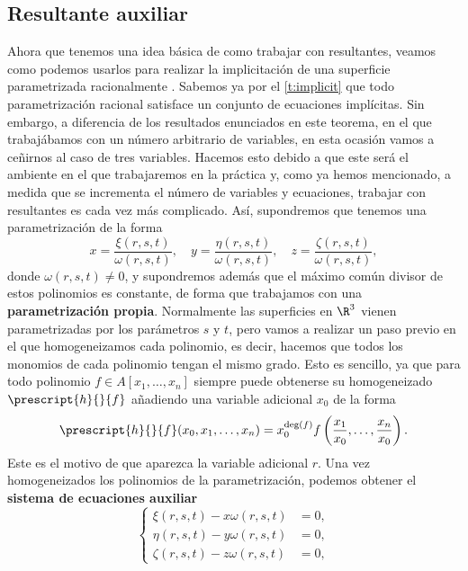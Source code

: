 \subsection{Resultante auxiliar}
Ahora que tenemos una idea básica de como trabajar con resultantes, veamos como podemos usarlos para realizar la implicitación de una superficie parametrizada racionalmente \cite{res1}. Sabemos ya por el \autoref{t:implicit} que todo parametrización racional satisface un conjunto de ecuaciones implícitas. Sin embargo, a diferencia de los resultados enunciados en este teorema, en el que trabajábamos con un número arbitrario de variables, en esta ocasión vamos a ceñirnos al caso de tres variables. Hacemos esto debido a que este será el ambiente en el que trabajaremos en la práctica y, como ya hemos mencionado, a medida que se incrementa el número de variables y ecuaciones, trabajar con resultantes es cada vez más complicado. Así, supondremos que tenemos una parametrización de la forma
\begin{equation}\label{eq:param}
    x = \frac{\xi(r,s,t)}{\omega(r,s,t)},\quad y= \frac{\eta(r,s,t)}{\omega(r,s,t)},\quad  z= \frac{\zeta(r,s,t)}{\omega(r,s,t)},
\end{equation}
donde $\omega(r,s,t)\neq 0$, y supondremos además que el máximo común divisor de estos polinomios es constante, de forma que trabajamos con una \textbf{parametrización propia}. Normalmente las superficies en $\R^3$ vienen parametrizadas por los parámetros $s$ y $t$, pero vamos a realizar un paso previo en el que homogeneizamos cada polinomio, es decir, hacemos que todos los monomios de cada polinomio tengan el mismo grado. Esto es sencillo, ya que para todo polinomio $f\in A[x_1,\dots, x_n]$ siempre puede obtenerse su homogeneizado $\prescript{h}{}{f}$ añadiendo una variable adicional $x_0$ \cite{wiki-homog} de la forma
\begin{equation*}
    \prescript{h}{}{f}(x_0,x_1,\dots, x_n) = x_0^{\deg(f)}f\left(\frac{x_1}{x_0},\dots, \frac{x_n}{x_0}  \right).
\end{equation*}
Este es el motivo de que aparezca la variable adicional $r$. Una vez homogeneizados los polinomios de la parametrización, podemos obtener el \textbf{sistema de ecuaciones auxiliar}
\begin{equation}\label{eq:aux}
    \begin{cases}
        \xi(r,s,t)-x\omega(r,s,t) &= 0,\\
         \eta(r,s,t)-y\omega(r,s,t) &= 0,\\
          \zeta(r,s,t)-z\omega(r,s,t) &= 0,
    \end{cases}
\end{equation}
